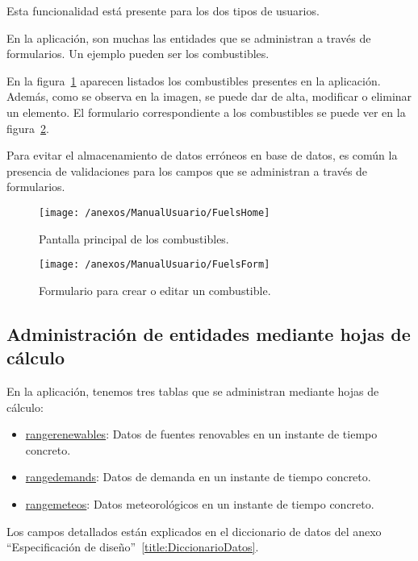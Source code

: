 Esta funcionalidad está presente para los dos tipos de usuarios. 

En la aplicación, son muchas las entidades que se administran a través de formularios. Un ejemplo pueden ser los combustibles.

En la figura~\ref{img:FuelsHome} aparecen listados los combustibles presentes en la aplicación. Además, como se observa en la imagen, se puede dar de alta, modificar o eliminar un elemento. El formulario correspondiente a los combustibles se puede ver en la figura~\ref{img:FuelsForm}.

Para evitar el almacenamiento de datos erróneos en base de datos, es común la presencia de validaciones para los campos que se administran a través de formularios. 

\begin{figure}[h]
	\centering
	\texttt{[image: /anexos/ManualUsuario/FuelsHome]}
	\caption{Pantalla principal de los combustibles.}
	\label{img:FuelsHome}
\end{figure}

\begin{figure}[h]
	\centering
	\texttt{[image: /anexos/ManualUsuario/FuelsForm]}
	\caption{Formulario para crear o editar un combustible.}
	\label{img:FuelsForm}
\end{figure}

\newpage

\subsection{Administración de entidades mediante hojas de cálculo}

En la aplicación, tenemos tres tablas que se administran mediante hojas de cálculo:
\begin{itemize}
	\item \href{https://www.proyectoubu.nesiweb.com/rangerenewables/technologies}{rangerenewables}: Datos de fuentes renovables en un instante de tiempo concreto.
	\item \href{https://www.proyectoubu.nesiweb.com/rangedemands/home}{rangedemands}: Datos de demanda en un instante de tiempo concreto.
	\item \href{https://www.proyectoubu.nesiweb.com/rangemeteos/home}{rangemeteos}: Datos meteorológicos en un instante de tiempo concreto.
\end{itemize}

Los campos detallados están explicados en el diccionario de datos del anexo ``Especificación de diseño''~\ref{title:DiccionarioDatos}. 
 

